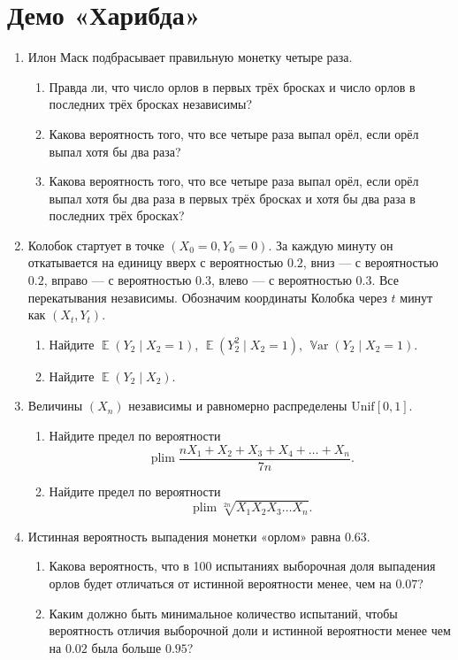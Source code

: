 \documentclass[12pt]{article}
\DeclareMathOperator{\Var}{\mathbb{V}ar}
\DeclareMathOperator{\plim}{plim}
\DeclareMathOperator{\E}{\mathbb{E}}
\newcommand \dUnif{\mathrm{Unif}}
\begin{document}
\section*{Демо «Харибда»}
\begin{enumerate}
\item Илон Маск подбрасывает правильную монетку четыре раза. 
\begin{enumerate}
    \item Правда ли, что число орлов в первых трёх бросках и число орлов в последних трёх бросках независимы?
    \item Какова вероятность того, что все четыре раза выпал орёл, если орёл выпал хотя бы два раза?
    \item Какова вероятность того, что все четыре раза выпал орёл, если орёл выпал хотя бы два раза в первых трёх бросках и хотя бы два раза в последних трёх бросках?
\end{enumerate}

\item Колобок стартует в точке $(X_0=0, Y_0=0)$.
За каждую минуту он откатывается на единицу вверх с вероятностью $0.2$, вниз — с вероятностью $0.2$, вправо — с вероятностью $0.3$, влево — с вероятностью $0.3$.
Все перекатывания независимы. 
Обозначим координаты Колобка через $t$ минут как $(X_t, Y_t)$.
\begin{enumerate}
    \item Найдите $\E(Y_2 \mid X_2 = 1)$, $\E(Y_2^2 \mid X_2 = 1)$, $\Var(Y_2 \mid X_2 = 1)$.
    \item Найдите $\E(Y_2 \mid X_2)$.
\end{enumerate}

\item Величины $(X_n)$ независимы и равномерно распределены $\dUnif[0, 1]$.

\begin{enumerate}
  \item Найдите предел по вероятности
  \[
  \plim \frac{nX_1 + X_2 + X_3  + X_4 + \dots + X_n}{7n}.
  \]
  \item Найдите предел по вероятности
  \[
  \plim \sqrt[2n]{X_1 X_2 X_3 \dots X_n}.
  \]
\end{enumerate}

\item  Истинная вероятность выпадения монетки «орлом» равна $0.63$.
\begin{enumerate}
\item Какова вероятность, что в 100 испытаниях выборочная доля выпадения орлов будет
отличаться от истинной вероятности менее, чем на $0.07$?
\item Каким должно быть минимальное количество испытаний, чтобы вероятность отличия
выборочной доли и истинной вероятности менее чем на $0.02$ была больше $0.95$?
\end{enumerate}


\end{enumerate}
\end{document}
